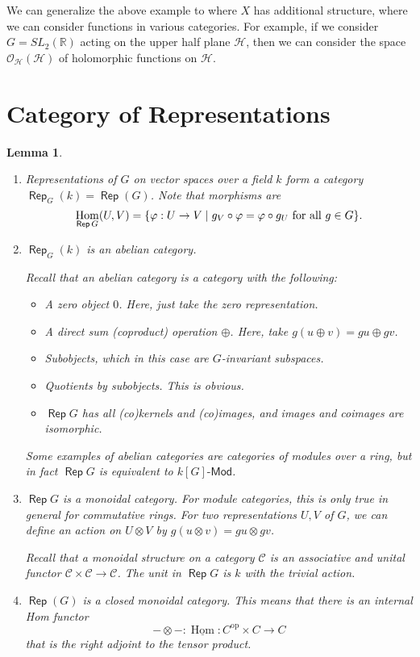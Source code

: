 \documentclass[leqno, openany]{memoir}
\newtheorem{lem}[thm]{Lemma}
\theoremstyle{definition}
\theoremstyle{remark}
\theoremstyle{plain}
\theoremstyle{definition}
\theoremstyle{remark}
\newcommand{\R}{\mathbb{R}}
\newcommand{\mc}[1]{\mathcal{#1}}
\newcommand{\mr}[1]{\mathrm{#1}}
\DeclareMathOperator{\Rep}{\mathsf{Rep}}
\DeclareMathOperator{\Hom}{Hom}
\begin{document}
We can generalize the above example to where $X$ has additional structure, where we can consider functions in various categories. For example, if we consider $G = SL_2(\R)$ acting on the upper half plane $\mc{H}$, then we can consider the space $\mc{O}_{\mc{H}}(\mc{H})$ of holomorphic functions on $\mc{H}$.

\section{Category of Representations}%
\label{sec:category_of_representations}

\begin{lem}
    \begin{enumerate}
        \item Representations of $G$ on vector spaces over a field $k$ form a category $\Rep_G(k) = \Rep(G)$. Note that morphisms are 
            \[ \Hom_{\Rep G}(U,V) = \qty{\varphi: U \to V \mid g_V \circ \varphi = \varphi \circ g_U \text{ for all } g \in G}. \]
        \item $\Rep_G(k)$ is an abelian category.

            Recall that an abelian category is a category with the following:
            \begin{itemize}
                \item A zero object $0$. Here, just take the zero representation.
                \item A direct sum (coproduct) operation $\oplus$. Here, take $g(u \oplus v) = gu \oplus gv$.
                \item Subobjects, which in this case are $G$-invariant subspaces.
                \item Quotients by subobjects. This is obvious.
                \item $\Rep G$ has all (co)kernels and (co)images, and images and coimages are isomorphic.
            \end{itemize}
            Some examples of abelian categories are categories of modules over a ring, but in fact $\Rep G$ is equivalent to $k[G]\text{-}\mathsf{Mod}$.
        \item $\Rep G$ is a monoidal category. For module categories, this is only true in general for commutative rings. For two representations $U,V$ of $G$, we can define an action on $U \otimes V$ by $g(u \otimes v) = gu \otimes gv$.

            Recall that a monoidal structure on a category $\mc{C}$ is an associative and unital functor $\mc{C} \times \mc{C} \to \mc{C}$. The unit in $\Rep G$ is $k$ with the trivial action.
        \item $\Rep(G)$ is a closed monoidal category. This means that there is an internal Hom functor 
            \[ - \otimes -: \underline{\Hom} \colon C^{\mr{op}} \times C \to C \] 
            that is the right adjoint to the tensor product.
    \end{enumerate}
\end{lem}
\end{document}
